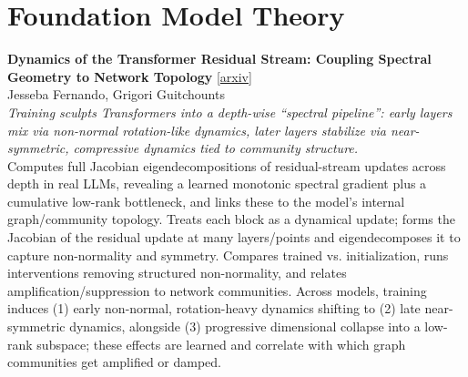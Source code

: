 \documentclass[12pt,letterpaper]{article}
\begin{document}
\medskip


\section*{Foundation Model Theory}

{\small\textbf{Dynamics of the Transformer Residual Stream: Coupling Spectral Geometry to Network Topology}} {\scriptsize[\href{https://arxiv.org/abs/2605.14258}{arxiv}]}\\
{\scriptsize Jesseba Fernando, Grigori Guitchounts}\\

{\small\textit{Training sculpts Transformers into a depth-wise ``spectral pipeline'': early layers mix via non-normal rotation-like dynamics, later layers stabilize via near-symmetric, compressive dynamics tied to community structure.}}\\[1pt]
{\footnotesize Computes full Jacobian eigendecompositions of residual-stream updates across depth in real LLMs, revealing a learned monotonic spectral gradient plus a cumulative low-rank bottleneck, and links these to the model's internal graph/community topology. Treats each block as a dynamical update; forms the Jacobian of the residual update at many layers/points and eigendecomposes it to capture non-normality and symmetry. Compares trained vs. initialization, runs interventions removing structured non-normality, and relates amplification/suppression to network communities. Across models, training induces (1) early non-normal, rotation-heavy dynamics shifting to (2) late near-symmetric dynamics, alongside (3) progressive dimensional collapse into a low-rank subspace; these effects are learned and correlate with which graph communities get amplified or damped.}

\medskip
\end{document}
